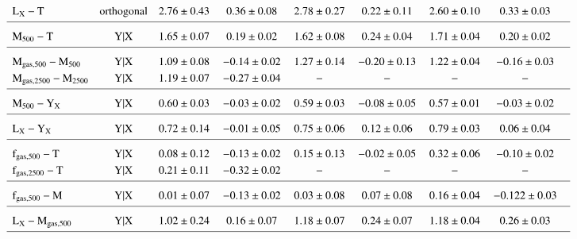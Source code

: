 \documentclass{aa} %
\begin{document}
\begin{table*}[ht]
$$\begin{array}{lcc@{\hspace{1.2em}}c@{\hspace{1.2em}}c@{\hspace{1.2em}}c@{\hspace{1.2em}}c@{\hspace{1.2em}}c@{\hspace{1.2em}}}
{\rm L_{\text{X}}-T }     & {\rm orthogonal} & 2.76\pm0.43 &  0.36\pm0.08 & 2.78\pm0.27 &  0.22\pm0.11 & 2.60\pm0.10 &  0.33\pm0.03 \\[0.1cm]   
\hline \\ [-1.0ex]
{\rm M_{\text{500}}-T}    & {\rm Y|X} & 1.65\pm0.07 & 0.19\pm0.02 & 1.62\pm0.08 & 0.24\pm0.04 & 1.71\pm0.04 & 0.20\pm0.02 \\[0.1cm]
\hline \\ [-1.0ex]
{\rm M_{\text{gas,500}}-M_{\text{500}}} & {\rm Y|X} & 1.09\pm0.08 & -0.14\pm0.02 & 1.27\pm0.14 & -0.20\pm0.13 & 1.22\pm0.04 & -0.16\pm0.03 \\[0.1cm]   
{\rm M_{\text{gas,2500}}-M_{\text{2500}}} & {\rm Y|X} & 1.19\pm0.07 & -0.27\pm0.04 & - & - & - & - \\[0.1cm]
\hline \\ [-1.0ex]
{\rm M_{\text{500}}-Y_{\text{X}}} & {\rm Y|X} & 0.60\pm0.03 & -0.03\pm0.02 & 0.59\pm0.03 & -0.08\pm0.05 & 0.57\pm0.01 & -0.03\pm0.02 \\[0.1cm] 
\hline \\ [-1.0ex]
{\rm L_{\text{X}}-Y_{\text{X}}}   & {\rm Y|X} & 0.72\pm0.14 & -0.01\pm0.05 & 0.75\pm0.06 &  0.12\pm0.06 & 0.79\pm0.03 &  0.06\pm0.04  \\[0.1cm]
\hline \\ [-1.0ex]
{\rm f_{\text{gas,500}}-T} & {\rm Y|X} & 0.08\pm0.12 & -0.13\pm0.02 & 0.15\pm0.13 & -0.02\pm0.05 & 0.32\pm0.06 & -0.10\pm0.02  \\[0.1cm]   
{\rm f_{\text{gas,2500}}-T} & {\rm Y|X} & 0.21\pm0.11 & -0.32\pm0.02 & - & - & - & - \\[0.1cm]
\hline \\ [-1.0ex]
{\rm f_{\text{gas,500}}-M} & {\rm Y|X} & 0.01\pm0.07 & -0.13\pm0.02 & 0.03\pm0.08 &  0.07\pm0.08 & 0.16\pm0.04 & -0.122\pm0.03  \\[0.1cm]   
\hline \\ [-1.0ex]
{\rm L_{\text{X}}-M_{\text{gas,500}}} & {\rm Y|X} & 1.02\pm0.24 & 0.16\pm0.07 & 1.18\pm0.07 & 0.24\pm0.07 & 1.18\pm0.04 & 0.26\pm0.03  \\[0.1cm]   
\hline
\end{array}
\label{tab:scalawmalm}
$$
\end{table*}
\end{document}
